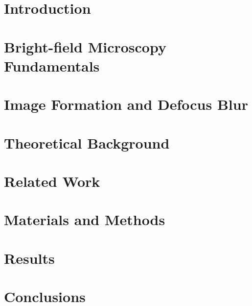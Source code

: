 \documentclass[mestrado, pos-defesa]{packages/icmc}
\begin{document}
\textual

\chapter{Introduction}
\label{chapter:introduction}


\chapter{Bright-field Microscopy Fundamentals}
\label{chapter:fundamentals-of-optics-and-light-microscopy}


\chapter{Image Formation and Defocus Blur}
\label{chapter:blur-characterization-and-image-formation}


\chapter{Theoretical Background}
\label{chapter:theoretical-background}


\chapter{Related Work}
\label{chapter:related-work}


\chapter{Materials and Methods}
\label{chapter:materials-and-methods}


\chapter{Results}
\label{chapter:results}


\chapter{Conclusions}
\label{chapter:conclusions}


\end{document}
